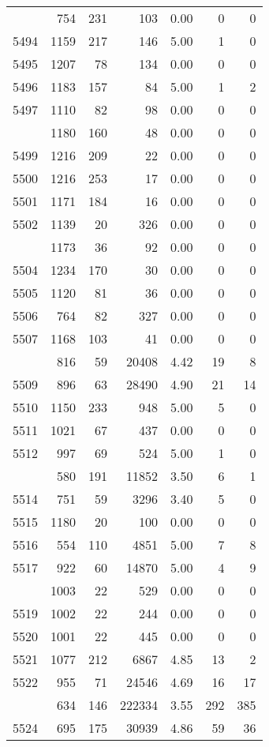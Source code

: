 \documentclass[
]{article}
\begin{document}
\begin{table}
\begin{tabular}[t]{lrrrrrr}
\addlinespace
5493 & 754 & 231 & 103 & 0.00 & 0 & 0\\
5494 & 1159 & 217 & 146 & 5.00 & 1 & 0\\
5495 & 1207 & 78 & 134 & 0.00 & 0 & 0\\
5496 & 1183 & 157 & 84 & 5.00 & 1 & 2\\
5497 & 1110 & 82 & 98 & 0.00 & 0 & 0\\
\addlinespace
5498 & 1180 & 160 & 48 & 0.00 & 0 & 0\\
5499 & 1216 & 209 & 22 & 0.00 & 0 & 0\\
5500 & 1216 & 253 & 17 & 0.00 & 0 & 0\\
5501 & 1171 & 184 & 16 & 0.00 & 0 & 0\\
5502 & 1139 & 20 & 326 & 0.00 & 0 & 0\\
\addlinespace
5503 & 1173 & 36 & 92 & 0.00 & 0 & 0\\
5504 & 1234 & 170 & 30 & 0.00 & 0 & 0\\
5505 & 1120 & 81 & 36 & 0.00 & 0 & 0\\
5506 & 764 & 82 & 327 & 0.00 & 0 & 0\\
5507 & 1168 & 103 & 41 & 0.00 & 0 & 0\\
\addlinespace
5508 & 816 & 59 & 20408 & 4.42 & 19 & 8\\
5509 & 896 & 63 & 28490 & 4.90 & 21 & 14\\
5510 & 1150 & 233 & 948 & 5.00 & 5 & 0\\
5511 & 1021 & 67 & 437 & 0.00 & 0 & 0\\
5512 & 997 & 69 & 524 & 5.00 & 1 & 0\\
\addlinespace
5513 & 580 & 191 & 11852 & 3.50 & 6 & 1\\
5514 & 751 & 59 & 3296 & 3.40 & 5 & 0\\
5515 & 1180 & 20 & 100 & 0.00 & 0 & 0\\
5516 & 554 & 110 & 4851 & 5.00 & 7 & 8\\
5517 & 922 & 60 & 14870 & 5.00 & 4 & 9\\
\addlinespace
5518 & 1003 & 22 & 529 & 0.00 & 0 & 0\\
5519 & 1002 & 22 & 244 & 0.00 & 0 & 0\\
5520 & 1001 & 22 & 445 & 0.00 & 0 & 0\\
5521 & 1077 & 212 & 6867 & 4.85 & 13 & 2\\
5522 & 955 & 71 & 24546 & 4.69 & 16 & 17\\
\addlinespace
5523 & 634 & 146 & 222334 & 3.55 & 292 & 385\\
5524 & 695 & 175 & 30939 & 4.86 & 59 & 36\\

\end{tabular}
\end{table}
\end{document}
